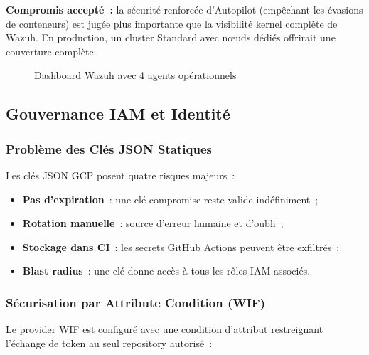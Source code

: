 \begin{warningbox}
\textbf{Compromis accepté~:} la sécurité renforcée d'Autopilot (empêchant les évasions de
conteneurs) est jugée plus importante que la visibilité kernel complète de Wazuh. En
production, un cluster Standard avec nœuds dédiés offrirait une couverture complète.
\end{warningbox}

\begin{figure}[H]
    \centering
    \caption{Dashboard Wazuh avec 4 agents opérationnels}
    \label{fig:wazuh_dashboard}
\end{figure}

\subsection{Gouvernance IAM et Identité}

\subsubsection{Problème des Clés JSON Statiques}

Les clés JSON GCP posent quatre risques majeurs~:
\begin{itemize}
  \item \textbf{Pas d'expiration}~: une clé compromise reste valide indéfiniment~;
  \item \textbf{Rotation manuelle}~: source d'erreur humaine et d'oubli~;
  \item \textbf{Stockage dans CI}~: les secrets GitHub Actions peuvent être exfiltrés~;
  \item \textbf{Blast radius}~: une clé donne accès à tous les rôles IAM associés.
\end{itemize}

\subsubsection{Sécurisation par Attribute Condition (WIF)}

Le provider WIF est configuré avec une condition d'attribut restreignant l'échange de
token au seul repository autorisé~:

